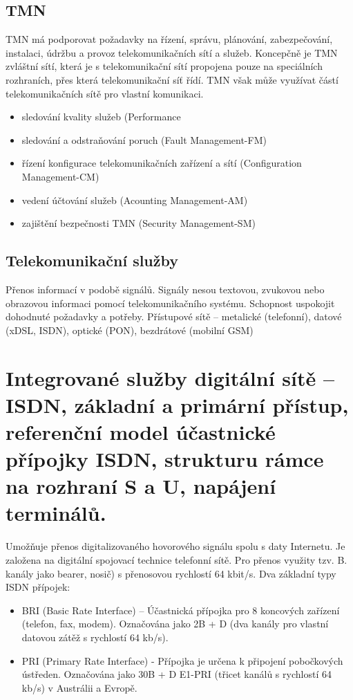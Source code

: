 \subsection{TMN}
TMN má podporovat požadavky na řízení, správu, plánování, zabezpečování, instalaci, údržbu a provoz telekomunikačních sítí a služeb. Koncepčně je TMN zvláštní sítí, která je s telekomunikační sítí propojena pouze na speciálních rozhraních, přes která telekomunikační síť řídí. TMN však může využívat částí telekomunikačních sítě pro vlastní komunikaci.
\begin{itemize}
    \item sledování kvality služeb (Performance
    \item sledování a odstraňování poruch (Fault Management-FM)
    \item řízení konfigurace telekomunikačních zařízení a sítí (Configuration Management-CM)
    \item vedení účtování služeb (Acounting Management-AM)
    \item zajištění bezpečnosti TMN (Security Management-SM)
\end{itemize}


\subsection{Telekomunikační služby}
Přenos informací v podobě signálů. Signály nesou textovou, zvukovou nebo obrazovou informaci pomocí telekomunikačního systému. Schopnost uspokojit dohodnuté požadavky a potřeby. 
Přístupové sítě -- metalické (telefonní), datové (xDSL, ISDN), optické (PON), bezdrátové (mobilní GSM)


\clearpage
\section{Integrované služby digitální sítě – ISDN, základní a primární přístup, referenční model účastnické přípojky ISDN, strukturu rámce na rozhraní S a U, napájení terminálů.}
Umožňuje přenos digitalizovaného hovorového signálu spolu s daty Internetu. Je založena na digitální spojovací technice telefonní sítě.
Pro přenos využity tzv. B. kanály jako bearer, nosič) s přenosovou rychlostí 64 kbit/s.
Dva základní typy ISDN přípojek:
\begin{itemize}
    \item BRI (Basic Rate Interface) – Účastnická přípojka pro 8 koncových zařízení (telefon, fax, modem). Označována jako 2B + D (dva kanály pro vlastní datovou zátěž s rychlostí 64 kb/s).
    \item PRI (Primary Rate Interface) - Přípojka je určena k připojení pobočkových ústředen. Označována jako 30B + D E1-PRI (třicet kanálů s rychlostí 64 kb/s) v Austrálii a Evropě.
\end{itemize}


